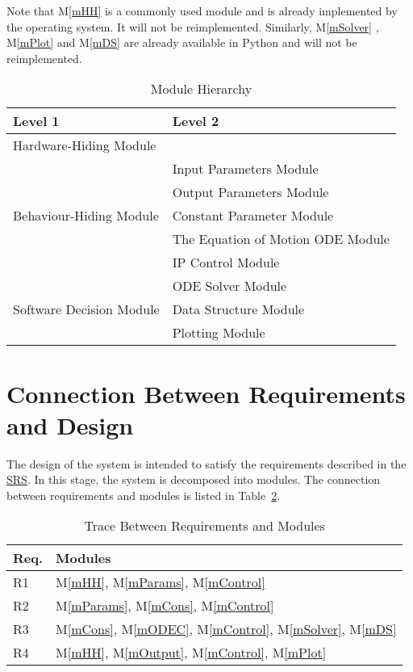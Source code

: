 \documentclass[12pt, titlepage]{article}
\newcommand{\mref}[1]{M\ref{#1}}
\begin{document}
Note that \mref{mHH} is a commonly used module and is already implemented by the operating system.  It will not be reimplemented.  Similarly, \mref{mSolver} , \mref{mPlot} and  \mref{mDS} are already available in Python and will not be reimplemented.



\begin{table}[h!]
\centering
\begin{tabular}{p{} p{}}
\toprule
\textbf{Level 1} & \textbf{Level 2}\\
\midrule

{Hardware-Hiding Module} & ~ \\
\midrule

\multirow{5}{0.3\textwidth}{Behaviour-Hiding Module} & Input Parameters Module\\
& Output Parameters Module\\
& Constant Parameter Module\\
&The Equation of Motion ODE Module\\
& IP Control Module\\
\midrule

\multirow{3}{0.3\textwidth}{Software Decision Module} & {ODE Solver Module}\\
& Data Structure Module\\
& Plotting Module\\
\bottomrule

\end{tabular}
\caption{Module Hierarchy}
\label{TblMH}
\end{table}

\section{Connection Between Requirements and Design} \label{SecConnection}

The design of the system is intended to satisfy the requirements described in the \href{https://github.com/MinMah23/CAS741-Project/tree/main/docs/SRS}{SRS}. In this stage, the system is decomposed into modules. The connection
between requirements and modules is listed in Table~\ref{TblRT}.
\begin{table}[H]
\centering
\begin{tabular}{p{} p{}}
\toprule
\textbf{Req.} & \textbf{Modules}\\
\midrule
R1 &  \mref{mHH}, \mref{mParams}, \mref{mControl}\\
R2 & \mref{mParams}, \mref{mCons}, \mref{mControl}\\
R3 & \mref{mCons}, \mref{mODEC}, \mref{mControl}, \mref{mSolver}, \mref{mDS}\\
R4 & \mref{mHH}, \mref{mOutput}, \mref{mControl}, \mref{mPlot}\\

\bottomrule
\end{tabular}
\caption{Trace Between Requirements and Modules}
\label{TblRT}
\end{table}
\end{document}
